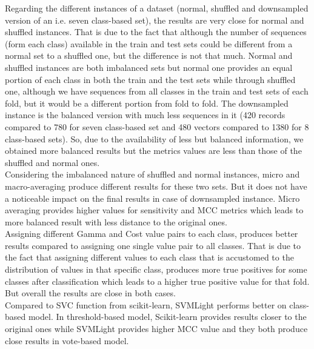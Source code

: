         Regarding the different instances of a dataset (normal, shuffled and downsampled version of an i.e. seven class-based set), 
        the results are very close for normal and shuffled instances. That is due to the fact that although the number of sequences 
        (form each class) available in the train and test sets could be different from a normal set to a shuffled one, 
        but the difference is not that much. Normal and shuffled instances are both imbalanced sets but normal one provides 
        an equal portion of each class in both the train and the test sets while through shuffled one, although we have sequences 
        from all classes in the train and test sets of each fold, but it would be a different portion from fold to fold. 
        The downsampled instance is the balanced version with much less sequences in it (420 records compared to 780 for seven 
        class-based set and 480 vectors compared to 1380 for 8 class-based sets). So, due to the availability of less but balanced 
        information, we obtained more balanced results but the metrics values are less than those of the shuffled and normal ones.\\ 
        
        Considering the imbalanced nature of shuffled and normal instances, micro and macro-averaging produce different results 
        for these two sets. But it does not have a noticeable impact on the final results in case of downsampled instance. 
        Micro averaging provides higher values for sensitivity and MCC metrics which leads to more balanced result 
        with less distance to the original ones.\\
        
        Assigning different Gamma and Cost value pairs to each class, produces better results compared to assigning 
        one single value pair to all classes. That is due to the fact that assigning different values to each class that is 
        accustomed to the distribution of values in that specific class, produces more true positives for some classes after 
        classification which leads to a higher true positive value for that fold. But overall the results are close in both cases. \\
        
        Compared to SVC function from scikit-learn, SVMLight performs better on class-based model. In threshold-based model, 
        Scikit-learn provides results closer to the original ones while SVMLight provides higher MCC value and they both produce 
        close results in vote-based model.\\
        
